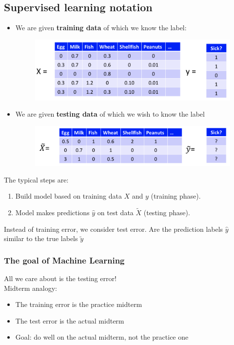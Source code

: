 \documentclass{article}
\theoremstyle{definition}
\begin{document}
\subsection*{Supervised learning notation}
\begin{itemize}
	\item We are given {\bf training data} of which we know the label:
	\begin{figure}[H]
		\centering
		\includegraphics[width = 5in]{Pic7}
	\end{figure}
	\item We are given {\bf testing data} of which we wish to know the label
	\begin{figure}[H]
		\centering
		\includegraphics[width = 5.25in]{Pic8}
	\end{figure}
\end{itemize}
The typical steps are:
\begin{enumerate}
	\item Build model based on training data $ X $ and $ y $ (training phase).
	\item Model makes predictions $ \hat{y} $ on test data $ \tilde{X} $  (testing phase).
\end{enumerate}
Instead of training error, we consider test error. Are the prediction labels $\hat{y}$ similar to the true labels $\tilde{y}$

\subsubsection*{The goal of Machine Learning}
All we care about is the testing error! \\
Midterm analogy:
\begin{itemize}
	\item The training error is the practice midterm
	\item The test error is the actual midterm
	\item Goal: do well on the actual midterm, not the practice one
\end{itemize}
\end{document}
